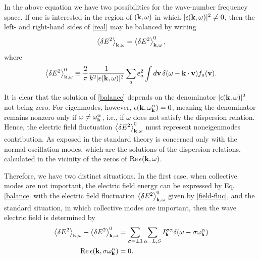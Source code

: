 \documentclass[12pt,a4paper,ruledheader]{report}
\begin{document}
In the above equation we have two possibilities for the wave-number
frequency space. If one is interested in the region of $({\bf k},\omega)$
in which $|\epsilon({\bf k},\omega)|^2\ne 0$, then the left- and right-hand
sides of \eqref{real} may be balanced by writing
\begin{equation}
  \label{balance}
  \left\langle \delta E^2 \right\rangle_{{\bf k},\omega}
  =\left\langle \delta E^2 \right\rangle_{{\bf k},\omega}^0,
\end{equation}
where
\begin{equation}
  \label{field-fluc}
  \left\langle \delta E^2 \right\rangle_{{\bf k},\omega}^0
  \equiv \frac{2}{\pi}\frac{1}{k^2|\epsilon({\bf k},\omega)|^2}
  \sum_a e_a^2 \int d{\bf v}\, \delta(\omega-{\bf k \cdot v})
  f_a({\bf v}).
\end{equation}

It is clear that the solution of \eqref{balance} depends on the denominator
$|\epsilon({\bf k},\omega)|^2$ not being zero. For eigenmodes, however,
$\epsilon({\bf k},\omega_{\bf k}^\alpha)=0$, meaning the denominator remains
nonzero only if $\omega \ne \omega_{\bf k}^\alpha$, i.e., if $\omega$ does
not satisfy the dispersion relation. Hence, the electric field fluctuation
$\left< \delta E^2 \right>_{{\bf k},\omega}^0$ must represent noneigenmodes
contribution. As exposed in  the standard theory is
concerned only with the normal oscillation modes, which are the solutions
of the dispersion relations, calculated in the vicinity of the zeros of
$\mbox{Re}\,\epsilon({\bf k},\omega)$.


Therefore, we have two distinct situations. In the first case,
when collective modes are not important, the electric field energy
can be expressed by Eq. \eqref{balance} with the electric field fluctuation
$\left< \delta E^2 \right>_{{\bf k},\omega}^0$ given by \eqref{field-fluc},
and the standard situation, in which collective modes are important,
then the wave electric field is determined by
\begin{equation}
  \label{collective}
  \begin{split}
  \left< \delta E^2 \right>_{{\bf k},\omega}
  -\left< \delta E^2 \right>_{{\bf k},\omega}^0
  &=\sum_{\sigma=\pm 1}\sum_{\alpha=L,S}
    I_{\bf k}^{\sigma \alpha}\delta(\omega-\sigma \omega_{\bf k}^\alpha)\\
  \mbox{Re}\, \epsilon({\bf k},\sigma\omega_{\bf k}^\alpha)&=0.
\end{split}
\end{equation}
\end{document}
